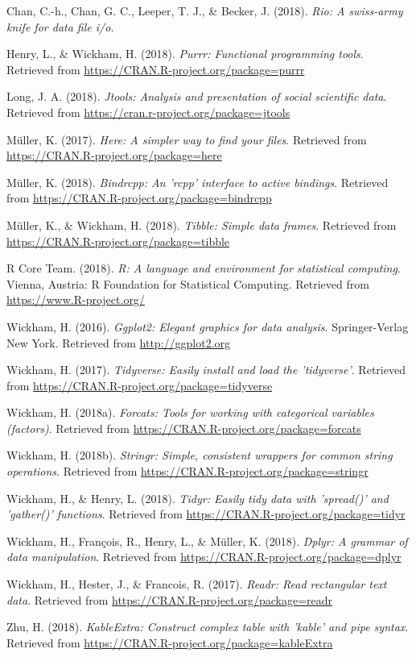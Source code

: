 \documentclass[man]{apa6}
\begin{document}
\hypertarget{ref-R-rio}{}
Chan, C.-h., Chan, G. C., Leeper, T. J., \& Becker, J. (2018).
\emph{Rio: A swiss-army knife for data file i/o}.

\hypertarget{ref-R-purrr}{}
Henry, L., \& Wickham, H. (2018). \emph{Purrr: Functional programming
tools}. Retrieved from \url{https://CRAN.R-project.org/package=purrr}

\hypertarget{ref-R-jtools}{}
Long, J. A. (2018). \emph{Jtools: Analysis and presentation of social
scientific data}. Retrieved from
\url{https://cran.r-project.org/package=jtools}

\hypertarget{ref-R-here}{}
Müller, K. (2017). \emph{Here: A simpler way to find your files}.
Retrieved from \url{https://CRAN.R-project.org/package=here}

\hypertarget{ref-R-bindrcpp}{}
Müller, K. (2018). \emph{Bindrcpp: An 'rcpp' interface to active
bindings}. Retrieved from
\url{https://CRAN.R-project.org/package=bindrcpp}

\hypertarget{ref-R-tibble}{}
Müller, K., \& Wickham, H. (2018). \emph{Tibble: Simple data frames}.
Retrieved from \url{https://CRAN.R-project.org/package=tibble}

\hypertarget{ref-R-base}{}
R Core Team. (2018). \emph{R: A language and environment for statistical
computing}. Vienna, Austria: R Foundation for Statistical Computing.
Retrieved from \url{https://www.R-project.org/}

\hypertarget{ref-R-ggplot2}{}
Wickham, H. (2016). \emph{Ggplot2: Elegant graphics for data analysis}.
Springer-Verlag New York. Retrieved from \url{http://ggplot2.org}

\hypertarget{ref-R-tidyverse}{}
Wickham, H. (2017). \emph{Tidyverse: Easily install and load the
'tidyverse'}. Retrieved from
\url{https://CRAN.R-project.org/package=tidyverse}

\hypertarget{ref-R-forcats}{}
Wickham, H. (2018a). \emph{Forcats: Tools for working with categorical
variables (factors)}. Retrieved from
\url{https://CRAN.R-project.org/package=forcats}

\hypertarget{ref-R-stringr}{}
Wickham, H. (2018b). \emph{Stringr: Simple, consistent wrappers for
common string operations}. Retrieved from
\url{https://CRAN.R-project.org/package=stringr}

\hypertarget{ref-R-tidyr}{}
Wickham, H., \& Henry, L. (2018). \emph{Tidyr: Easily tidy data with
'spread()' and 'gather()' functions}. Retrieved from
\url{https://CRAN.R-project.org/package=tidyr}

\hypertarget{ref-R-dplyr}{}
Wickham, H., François, R., Henry, L., \& Müller, K. (2018). \emph{Dplyr:
A grammar of data manipulation}. Retrieved from
\url{https://CRAN.R-project.org/package=dplyr}

\hypertarget{ref-R-readr}{}
Wickham, H., Hester, J., \& Francois, R. (2017). \emph{Readr: Read
rectangular text data}. Retrieved from
\url{https://CRAN.R-project.org/package=readr}

\hypertarget{ref-R-kableExtra}{}
Zhu, H. (2018). \emph{KableExtra: Construct complex table with 'kable'
and pipe syntax}. Retrieved from
\url{https://CRAN.R-project.org/package=kableExtra}

\endgroup
\end{document}
